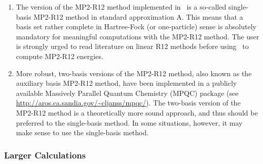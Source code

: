 \begin{enumerate}
\item
The version of the MP2-R12 method implemented in \PSIthree\
is a so-called single-basis MP2-R12 method
in standard approximation A. This means that a basis set
rather complete in Hartree-Fock (or one-particle) sense
is absolutely mandatory for meaningful computations with the MP2-R12
method. The user is strongly urged to read literature on
linear R12 methods before using \PSIthree\ to compute MP2-R12
energies.
\item
More robust, two-basis versions
of the MP2-R12 method, also known as the auxiliary basis
MP2-R12 method, have been implemented
in a publicly available Massively Parallel Quantum Chemistry (MPQC)
package (see \url{http://aros.ca.sandia.gov/~cljanss/mpqc/}).
The two-basis version of the MP2-R12 method is a theoretically more
sound approach, and thus should be preferred to the single-basis method.
In some situations, however, it may make sense to use
the single-basis method.
\end{enumerate}

\subsubsection{Larger Calculations}

